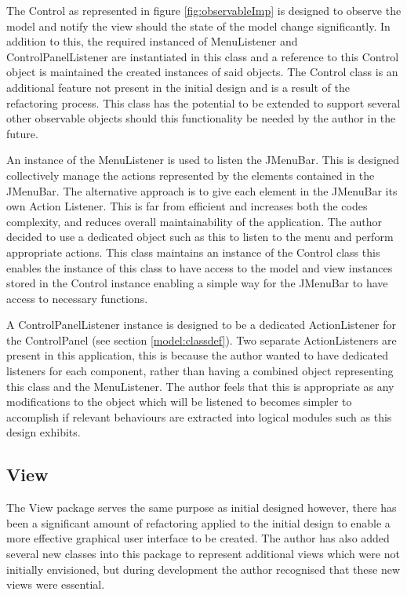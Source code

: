 The Control as represented in figure \ref{fig:observableImp} is designed to observe the model and notify the view should the state of the model change significantly. In addition to this, the required instanced of MenuListener and ControlPanelListener are instantiated in this class and a reference to this Control object is maintained the created instances of said objects. The Control class is an additional feature not present in the initial design and is a result of the refactoring process. This class has the potential to be extended to support several other observable objects should this functionality be needed by the author in the future.

An instance of the MenuListener is used to listen the JMenuBar. This is designed collectively manage the actions represented by the elements contained in the JMenuBar. The alternative approach is to give each element in the JMenuBar its own Action Listener. This is far from efficient and increases both the codes complexity, and reduces overall maintainability of the application. The author decided to use a dedicated object such as this to listen to the menu and perform appropriate actions. This class maintains an instance of the Control class this enables the instance of this class to have access to the model and view instances stored in the Control instance enabling a simple way for the JMenuBar to have access to necessary functions.

A ControlPanelListener instance is designed to be a dedicated ActionListener for the ControlPanel (see section \ref{model:classdef}). Two separate ActionListeners are present in this application, this is because the author wanted to have dedicated listeners for each component, rather than having a combined object representing this class and the MenuListener. The author feels that this is appropriate as any modifications to the object which will be listened to becomes simpler to accomplish if relevant behaviours are extracted into logical modules such as this design exhibits.

\subsection{View}

The View package serves the same purpose as initial designed however, there has been a significant amount of refactoring applied to the initial design to enable a more effective graphical user interface to be created. The author has also added several new classes into this package to represent additional views which were not initially envisioned, but during development the author recognised that these new views were essential.

